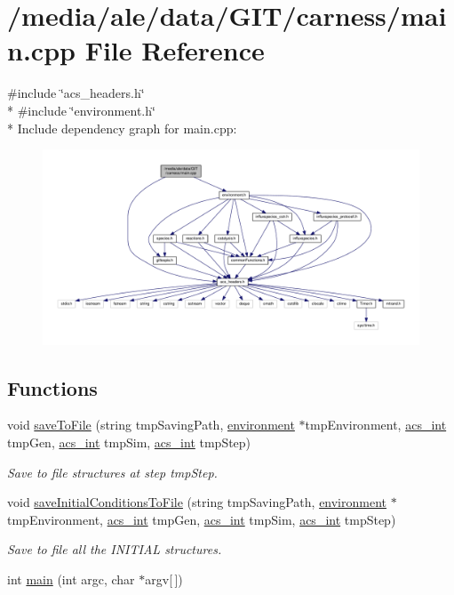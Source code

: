 \hypertarget{a00039}{\section{/media/ale/data/\-G\-I\-T/carness/main.cpp File Reference}
\label{a00039}
}
{\ttfamily \#include \char`\"{}acs\-\_\-headers.\-h\char`\"{}}\\*
{\ttfamily \#include \char`\"{}environment.\-h\char`\"{}}\\*
Include dependency graph for main.\-cpp\-:\nopagebreak
\begin{figure}[H]
\begin{center}
\leavevmode
\includegraphics[width=350pt]{a00073}
\end{center}
\end{figure}
\subsection*{Functions}
\begin{DoxyCompactItemize}
\item 
void \hyperlink{a00039_acac21f7e718db9d00451e3caaaacc25f}{save\-To\-File} (string tmp\-Saving\-Path, \hyperlink{a00011}{environment} $\ast$tmp\-Environment, \hyperlink{a00024_a8d277355641a098190360234e2ebde35}{acs\-\_\-int} tmp\-Gen, \hyperlink{a00024_a8d277355641a098190360234e2ebde35}{acs\-\_\-int} tmp\-Sim, \hyperlink{a00024_a8d277355641a098190360234e2ebde35}{acs\-\_\-int} tmp\-Step)
\begin{DoxyCompactList}\small\item\em Save to file structures at step tmp\-Step. \end{DoxyCompactList}\item 
void \hyperlink{a00039_a4665c5f33b43dfc8fae4757552028cc0}{save\-Initial\-Conditions\-To\-File} (string tmp\-Saving\-Path, \hyperlink{a00011}{environment} $\ast$tmp\-Environment, \hyperlink{a00024_a8d277355641a098190360234e2ebde35}{acs\-\_\-int} tmp\-Gen, \hyperlink{a00024_a8d277355641a098190360234e2ebde35}{acs\-\_\-int} tmp\-Sim, \hyperlink{a00024_a8d277355641a098190360234e2ebde35}{acs\-\_\-int} tmp\-Step)
\begin{DoxyCompactList}\small\item\em Save to file all the I\-N\-I\-T\-I\-A\-L structures. \end{DoxyCompactList}\item 
int \hyperlink{a00039_a0ddf1224851353fc92bfbff6f499fa97}{main} (int argc, char $\ast$argv\mbox{[}$\,$\mbox{]})
\end{DoxyCompactItemize}


